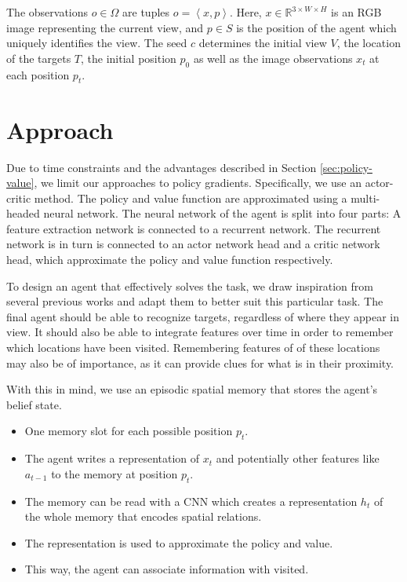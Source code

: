 
The observations \(o \in \Omega\) are tuples \(o = \left\langle x, p \right\rangle\).
Here, \(x \in \mathbb{R}^{3 \times W \times H}\) is an RGB image representing the current view, and \(p \in S\) is the position of the agent which uniquely identifies the view.
The seed \(c\) determines the initial view \(V\), the location of the targets \(T\), the initial position \(p_0\) as well as the image observations \(x_t\) at each position \(p_t\).

\section{Approach}
\label{sec:approach}

Due to time constraints and the advantages described in Section \ref{sec:policy-value}, we limit our approaches to policy gradients.
Specifically, we use an actor-critic method.
The policy and value function are approximated using a multi-headed neural network.
The neural network of the agent is split into four parts:
A feature extraction network is connected to a recurrent network.
The recurrent network is in turn is connected to an actor network head and a critic network head, which approximate the policy and value function respectively.

To design an agent that effectively solves the task, we draw inspiration from several previous works and adapt them to better suit this particular task.
The final agent should be able to recognize targets, regardless of where they appear in view.
It should also be able to integrate features over time in order to remember which locations have been visited.
Remembering features of of these locations may also be of importance, as it can provide clues for what is in their proximity. 

With this in mind, we use an episodic spatial memory that stores the agent's belief state.

\begin{itemize}
    \item One memory slot for each possible position \(p_t\).
    \item The agent writes a representation of \(x_t\) and potentially other features like \(a_{t-1}\) to the memory at position \(p_t\).
    \item The memory can be read with a CNN which creates a representation \(h_t\) of the whole memory that encodes spatial relations.
    \item The representation is used to approximate the policy and value.
    \item This way, the agent can associate information with visited.
\end{itemize}

